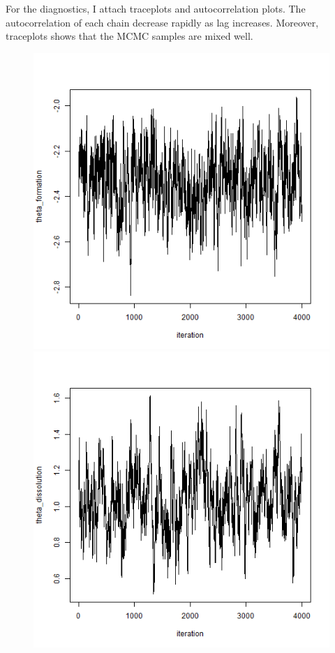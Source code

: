 \documentclass[aspectratio=169,ignorenonframetext,9pt]{beamer}
\theoremstyle{plain}
\theoremstyle{definition}
\begin{document}
For the diagnostics, I attach traceplots and autocorrelation plots.
The autocorrelation of each chain decrease rapidly as lag increases.
Moreover, traceplots shows that the MCMC samples are mixed well.
\begin{figure}[h]
    \begin{center}
        \includegraphics[scale=0.23]{pictures/net1seq_chain1_BSTERGM_formation_traceplot.png}
        \includegraphics[scale=0.23]{pictures/net1seq_chain1_BSTERGM_dissolution_traceplot.png} \\

\end{center}
\end{figure}
\end{document}
